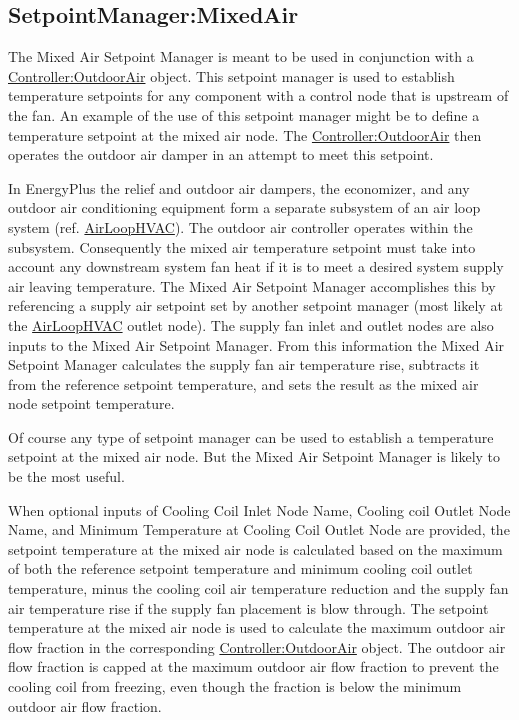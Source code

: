 \subsection{SetpointManager:MixedAir}\label{setpointmanagermixedair}

The Mixed Air Setpoint Manager is meant to be used in conjunction with a \hyperref[controlleroutdoorair]{Controller:OutdoorAir} object. This setpoint manager is used to establish temperature setpoints for any component with a control node that is upstream of the fan. An example of the use of this setpoint manager might be to define a temperature setpoint at the mixed air node. The \hyperref[controlleroutdoorair]{Controller:OutdoorAir} then operates the outdoor air damper in an attempt to meet this setpoint.

In EnergyPlus the relief and outdoor air dampers, the economizer, and any outdoor air conditioning equipment form a separate subsystem of an air loop system (ref. \hyperref[airloophvac]{AirLoopHVAC}). The outdoor air controller operates within the subsystem. Consequently the mixed air temperature setpoint must take into account any downstream system fan heat if it is to meet a desired system supply air leaving temperature. The Mixed Air Setpoint Manager accomplishes this by referencing a supply air setpoint set by another setpoint manager (most likely at the \hyperref[airloophvac]{AirLoopHVAC} outlet node). The supply fan inlet and outlet nodes are also inputs to the Mixed Air Setpoint Manager. From this information the Mixed Air Setpoint Manager calculates the supply fan air temperature rise, subtracts it from the reference setpoint temperature, and sets the result as the mixed air node setpoint temperature.

Of course any type of setpoint manager can be used to establish a temperature setpoint at the mixed air node. But the Mixed Air Setpoint Manager is likely to be the most useful.

When optional inputs of Cooling Coil Inlet Node Name, Cooling coil Outlet Node Name, and Minimum Temperature at Cooling Coil Outlet Node are provided, the setpoint temperature at the mixed air node is calculated based on the maximum of both the reference setpoint temperature and minimum cooling coil outlet temperature, minus the cooling coil air temperature reduction and the supply fan air temperature rise if the supply fan placement is blow through. The setpoint temperature at the mixed air node is used to calculate the maximum outdoor air flow fraction in the corresponding \hyperref[controlleroutdoorair]{Controller:OutdoorAir} object. The outdoor air flow fraction is capped at the maximum outdoor air flow fraction to prevent the cooling coil from freezing, even though the fraction is below the minimum outdoor air flow fraction.

